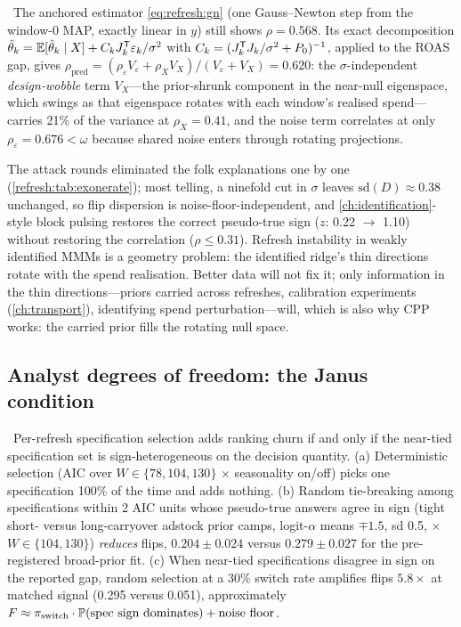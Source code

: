 \begin{proposition}
\label{refresh:prop:rotation}
\tagNumerical\ The anchored estimator \cref{eq:refresh:gn} (one Gauss--Newton step from the window-0 MAP, exactly linear in $y$) still shows $\rho = 0.568$. Its exact decomposition $\hat\theta_k = \mathbb{E}[\hat\theta_k \mid X] + C_kJ_k^{\mathsf{T}}\varepsilon_k/\sigma^2$ with $C_k = (J_k^{\mathsf{T}} J_k/\sigma^2 + P_0)^{-1}$, applied to the ROAS gap, gives $\rho_{\mathrm{pred}} = (\rho_{\varepsilon}V_{\varepsilon} + \rho_XV_X)/(V_{\varepsilon} + V_X) = 0.620$: the $\sigma$-independent \emph{design-wobble} term $V_X$---the prior-shrunk component in the near-null eigenspace, which swings as that eigenspace rotates with each window's realised spend---carries 21\% of the variance at $\rho_X = 0.41$, and the noise term correlates at only $\rho_\varepsilon = 0.676 < \omega$ because shared noise enters through rotating projections.
\end{proposition}

The attack rounds eliminated the folk explanations one by one (\cref{refresh:tab:exonerate}); most telling, a ninefold cut in $\sigma$ leaves $\mathrm{sd}(D) \approx 0.38$ unchanged, so flip dispersion is noise-floor-independent, and \cref{ch:identification}-style block pulsing restores the correct pseudo-true sign ($z$: 0.22 $\to$ 1.10) without restoring the correlation ($\rho \le 0.31$). Refresh instability in weakly identified MMMs is a geometry problem: the identified ridge's thin directions rotate with the spend realisation. Better data will not fix it; only information in the thin directions---priors carried across refreshes, calibration experiments (\cref{ch:transport}), identifying spend perturbation---will, which is also why CPP works: the carried prior fills the rotating null space.

\subsection{Analyst degrees of freedom: the Janus condition}

\begin{proposition}
\label{refresh:prop:janus}
\tagNumerical\ Per-refresh specification selection adds ranking churn if and only if the near-tied specification set is sign-heterogeneous on the decision quantity. (a) Deterministic selection (AIC over $W \in \{78, 104, 130\}$ $\times$ seasonality on/off) picks one specification 100\% of the time and adds nothing. (b) Random tie-breaking among specifications within 2 AIC units whose pseudo-true answers agree in sign (tight short- versus long-carryover adstock prior camps, logit-$\alpha$ means $\mp 1.5$, sd 0.5, $\times$ $W \in \{104, 130\}$) \emph{reduces} flips, $0.204 \pm 0.024$ versus $0.279 \pm 0.027$ for the pre-registered broad-prior fit. (c) When near-tied specifications disagree in sign on the reported gap, random selection at a 30\% switch rate amplifies flips $5.8\times$ at matched signal (0.295 versus 0.051), approximately $F \approx \pi_{\mathrm{switch}}\cdot\mathbb{P}(\text{spec sign dominates}) + \text{noise floor}$.
\end{proposition}

